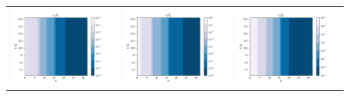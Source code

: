 \documentclass[a4,12pt]{article}
\begin{document}
\begin{itemize}
\begin{figure}[h]\centering
\begin{tabular}{ccc}
 \includegraphics[scale=0.35]{figures/Figure_1.png} &
 \includegraphics[scale=0.35]{figures/Figure_2.png} &
 \includegraphics[scale=0.35]{figures/Figure_3.png} \\

\end{tabular}
\end{figure}
\end{itemize}
\end{document}

